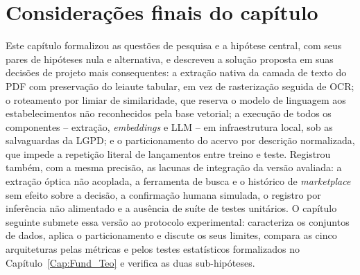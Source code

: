 \section{Considerações finais do capítulo}
\label{sec:sol_consideracoes_finais}

Este capítulo formalizou as questões de pesquisa e a hipótese central, com seus pares de hipóteses nula e alternativa, e descreveu a solução proposta em suas decisões de projeto mais consequentes: a extração nativa da camada de texto do PDF com preservação do leiaute tabular, em vez de rasterização seguida de OCR; o roteamento por limiar de similaridade, que reserva o modelo de linguagem aos estabelecimentos não reconhecidos pela base vetorial; a execução de todos os componentes -- extração, \textit{embeddings} e LLM -- em infraestrutura local, sob as salvaguardas da LGPD; e o particionamento do acervo por descrição normalizada, que impede a repetição literal de lançamentos entre treino e teste. Registrou também, com a mesma precisão, as lacunas de integração da versão avaliada: a extração óptica não acoplada, a ferramenta de busca e o histórico de \textit{marketplace} sem efeito sobre a decisão, a confirmação humana simulada, o registro por inferência não alimentado e a ausência de suíte de testes unitários. O capítulo seguinte submete essa versão ao protocolo experimental: caracteriza os conjuntos de dados, aplica o particionamento e discute os seus limites, compara as cinco arquiteturas pelas métricas e pelos testes estatísticos formalizados no Capítulo~\ref{Cap:Fund_Teo} e verifica as duas sub-hipóteses.






